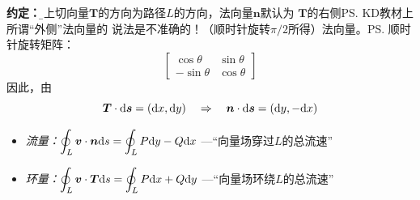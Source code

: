 {\bf 约定：}{\b 以上切向量$\bm{T}$的方向为路径$L$的方向，法向量$\bm{n}$默认为
$\bm{T}$的右侧\ps{KD教材上所谓“外侧”法向量的
说法是不准确的！}（顺时针旋转$\pi/2$所得）法向量。}\ps{顺时针旋转矩阵：
$$\left[\begin{array}{cc}
	\cos\theta & \sin\theta \\ -\sin\theta & \cos\theta
\end{array}\right]$$
}因此，由
$$\bm{T}\cdot\mathrm{d}\bm{s}=(\mathrm{d} x, \mathrm{d} y)\quad\Rightarrow
\quad\bm{n}\cdot\mathrm{d}\bm{s}=(\mathrm{d} y,-\mathrm{d} x)$$

\begin{itemize}
  \item {\it 流量：}$\displaystyle\oint_L\bm{v}\cdot\bm{n}\mathrm{d} s=\oint_LP\mathrm{d} y-Q\mathrm{d} x$
  {\;—“向量场穿过$L$的总流速”}
  \item {\it 环量：}$\displaystyle\oint_L\bm{v}\cdot\bm{T}\mathrm{d} s=\oint_LP\mathrm{d} x+Q\mathrm{d} y$
  {\;—“向量场环绕$L$的总流速”}
\end{itemize}

